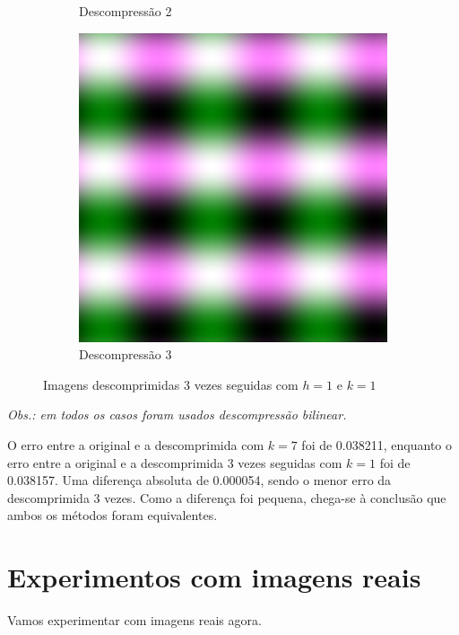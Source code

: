 \documentclass{article}
\begin{document}
\begin{figure}[ht]
\begin{subfigure}{0.3\textwidth}
    \caption{Descompressão 2}
  \end{subfigure}%
  \hfill
  \begin{subfigure}{0.3\textwidth}
    \centering
    \includegraphics[width=\textwidth]{senoidal/decompress3vezes/decompressed3.png}
    \caption{Descompressão 3}
  \end{subfigure}%
  \caption{Imagens descomprimidas 3 vezes seguidas com $h=1$ e $k=1$}
\end{figure}

\newpage

\textit{Obs.: em todos os casos foram usados descompressão bilinear.}

O erro entre a original e a descomprimida com $k=7$ foi de 0.038211, enquanto
o erro entre a original e a descomprimida 3 vezes seguidas com $k=1$ foi de
0.038157. Uma diferença absoluta de 0.000054, sendo o menor erro da descomprimida
3 vezes. Como a diferença foi pequena, chega-se à conclusão que ambos os métodos
foram equivalentes.

\section{Experimentos com imagens reais}

Vamos experimentar com imagens reais agora.
\end{document}
